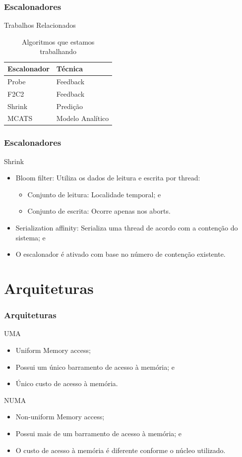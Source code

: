\documentclass[10pt, pdf,xcolor=pdftex,dvipsnames,table]{beamer}
\begin{document}
\begin{frame} \frametitle{Escalonadores}
\begin{block}{Trabalhos Relacionados}
\begin{table}[]
\footnotesize
\centering
\caption{Algoritmos que estamos trabalhando}
\label{tab:compare}
\begin{tabular}{l|l}
\hline
Escalonador & Técnica \\ \hline
Probe & Feedback \\
F2C2 & Feedback \\
Shrink & Predição \\
MCATS & Modelo Analítico \\
\hline
\end{tabular}
\end{table}
\end{block}
\end{frame}

\begin{frame} \frametitle{Escalonadores}
\begin{block}{Shrink}
\begin{itemize}
    \item Bloom filter: Utiliza os dados de leitura e escrita por thread:
    \begin{itemize}
        \item Conjunto de leitura: Localidade temporal; e
        \item Conjunto de escrita: Ocorre apenas nos aborts.
    \end{itemize}
    \item Serialization affinity: Serializa uma thread de acordo com a contenção do sistema; e
    \item O escalonador é ativado com base no número de contenção existente.
\end{itemize}
\end{block}
\end{frame}

\section{Arquiteturas}
\begin{frame} \frametitle{Arquiteturas}
\begin{block}{UMA}
\begin{itemize}
	\item Uniform Memory access;
	\item Possui um único barramento de acesso à memória; e
	\item Único custo de acesso à memória.
\end{itemize}
\end{block}
\begin{block}{NUMA}
\begin{itemize}
	\item Non-uniform Memory access;
	\item Possui mais de um barramento de acesso à memória; e
	\item O custo de acesso à memória é diferente conforme o núcleo utilizado.
\end{itemize}
\end{block}
\end{frame}
\end{document}
